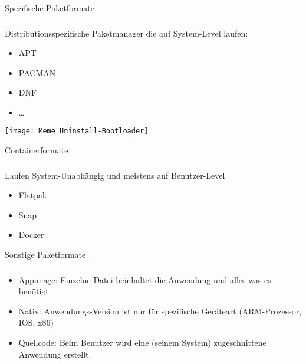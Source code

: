 \begin{frame}{Spezifische Paketformate}
    \subsubsection{}\label{subsubsec:spezifische-formate}

        Distributionsspezifische Paketmanager die auf System-Level laufen:
        \begin{itemize}
            \item APT
            \item PACMAN
            \item DNF
            \item \ldots
        \end{itemize}
    \endminipage\hfill
        \texttt{[image: Meme\_Uninstall-Bootloader]}
    \endminipage\hfill
\end{frame}

\begin{frame}{Containerformate}
    \subsubsection{}\label{subsubsec:containerformate}

    Laufen System-Unabhängig und meistens auf Benutzer-Level

    \begin{itemize}
        \item Flatpak
        \item Snap
        \item Docker
    \end{itemize}

\end{frame}

\begin{frame}{Sonstige Paketformate}
    \subsubsection{}\label{subsubsec:sonstige-paketformate}

    \begin{itemize}
        \item Appimage: Einzelne Datei beinhaltet die Anwendung und alles was es benötigt
        \item Nativ: Anwendungs-Version ist nur für spezifische Geräteart (ARM-Prozessor, IOS, x86)
        \item Quellcode: Beim Benutzer wird eine (seinem System) zugeschnittene Anwendung erstellt.
    \end{itemize}

\end{frame}

